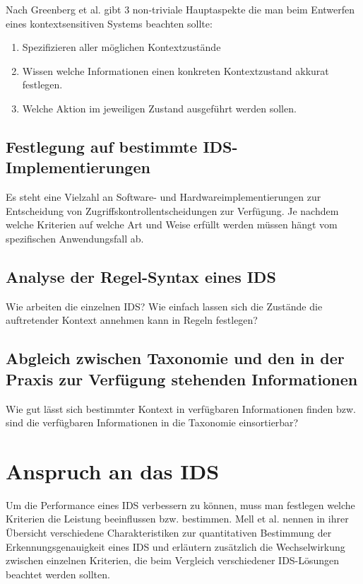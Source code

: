  Nach Greenberg et al. \cite{greenberg2001context} gibt 3 non-triviale Hauptaspekte die man beim Entwerfen eines kontextsensitiven Systems beachten sollte: 
\begin{enumerate}
\item{Spezifizieren aller möglichen Kontextzustände}
\item{Wissen welche Informationen einen konkreten Kontextzustand akkurat festlegen.}
\item{Welche Aktion im jeweiligen Zustand ausgeführt werden sollen.}
\end{enumerate}

\subsection{ Festlegung auf bestimmte IDS-Implementierungen}
Es steht eine Vielzahl an Software- und Hardwareimplementierungen zur Entscheidung von Zugriffskontrollentscheidungen zur  Verfügung.
Je nachdem welche Kriterien auf welche Art und Weise erfüllt werden müssen hängt vom spezifischen Anwendungsfall ab.
\subsection{Analyse der Regel-Syntax eines IDS}
Wie arbeiten die einzelnen IDS? Wie einfach lassen sich die Zustände die auftretender Kontext annehmen kann in Regeln festlegen?
\subsection{ Abgleich zwischen Taxonomie und den in der Praxis zur Verfügung stehenden Informationen}
Wie gut lässt sich bestimmter Kontext in verfügbaren Informationen finden bzw. sind die verfügbaren Informationen in die Taxonomie einsortierbar?
\section{Anspruch an das IDS}
Um die Performance eines IDS verbessern zu können, muss man festlegen welche Kriterien die Leistung beeinflussen bzw. bestimmen.
Mell et al.\cite{mell2003overview} nennen in ihrer Übersicht verschiedene Charakteristiken zur quantitativen Bestimmung der Erkennungsgenauigkeit eines IDS und erläutern zusätzlich die Wechselwirkung zwischen einzelnen Kriterien, die beim Vergleich verschiedener IDS-Lösungen beachtet werden sollten.
